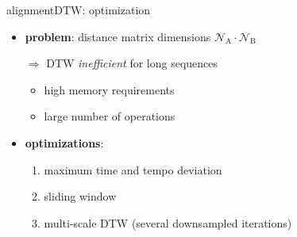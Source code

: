         \begin{frame}{alignment}{DTW: optimization}
            \vspace{-3mm}
            \begin{itemize}
                \item \textbf{problem}:  distance matrix dimensions  $\mathcal{N}_\mathrm{A}\cdot \mathcal{N}_\mathrm{B}$
                \item[$\Rightarrow$] DTW \textit{inefficient} for long sequences 
                    \begin{itemize}
                        \item	high memory requirements
                        \item	large number of operations
                    \end{itemize}
                \item<2-> \textbf{optimizations}:  
                    \begin{enumerate}
                        \item	maximum time and tempo deviation
                        \item<3->	sliding window 
                        \item<4->	multi-scale DTW (several downsampled iterations)
                    \end{enumerate}
            \end{itemize}
        \end{frame}

